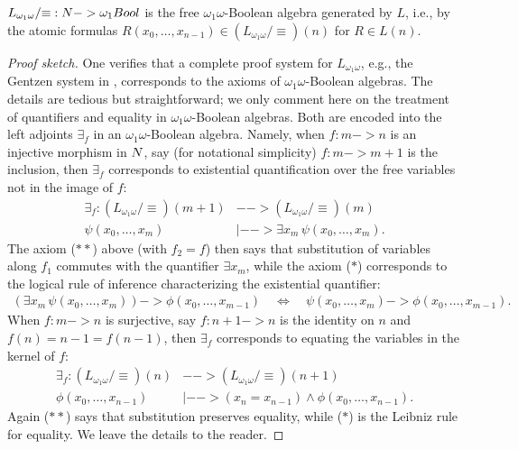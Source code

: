 \documentclass[11pt]{article}
\begin{document}
\begin{proposition}
$L_{\omega_1\omega}/{\equiv} : \*N -> \*{\omega_1 Bool}$ is the free $\omega_1\omega$-Boolean algebra generated by $L$, i.e., by the atomic formulas $R(x_0, \dotsc, x_{n-1}) \in (L_{\omega_1\omega}/{\equiv})(n)$ for $R \in L(n)$.
\end{proposition}
\begin{proof}[Proof sketch]
One verifies that a complete proof system for $L_{\omega_1\omega}$, e.g., the Gentzen system in \cite{LE}, corresponds to the axioms of $\omega_1\omega$-Boolean algebras.  The details are tedious but straightforward; we only comment here on the treatment of quantifiers and equality in $\omega_1\omega$-Boolean algebras.  Both are encoded into the left adjoints $\exists_f$ in an $\omega_1\omega$-Boolean algebra.  Namely, when $f : m -> n$ is an injective morphism in $\*N$, say (for notational simplicity) $f : m -> m+1$ is the inclusion, then $\exists_f$ corresponds to existential quantification over the free variables not in the image of $f$:
\begin{align*}
\exists_f : (L_{\omega_1\omega}/{\equiv})(m+1) &--> (L_{\omega_1\omega}/{\equiv})(m) \\
\psi(x_0, \dotsc, x_m) &|--> \exists x_m\, \psi(x_0, \dotsc, x_m).
\end{align*}
The axiom ($**$) above (with $f_2 = f$) then says that substitution of variables along $f_1$ commutes with the quantifier $\exists x_m$, while the axiom ($*$) corresponds to the logical rule of inference characterizing the existential quantifier:
\begin{align*}
(\exists x_m\, \psi(x_0, \dotsc, x_m)) -> \phi(x_0, \dotsc, x_{m-1}) \quad\iff\quad \psi(x_0, \dotsc, x_m) -> \phi(x_0, \dotsc, x_{m-1}).
\end{align*}
When $f : m -> n$ is surjective, say $f : n+1 -> n$ is the identity on $n$ and $f(n) = n-1 = f(n-1)$, then $\exists_f$ corresponds to equating the variables in the kernel of $f$:
\begin{align*}
\exists_f : (L_{\omega_1\omega}/{\equiv})(n) &--> (L_{\omega_1\omega}/{\equiv})(n+1) \\
\phi(x_0, \dotsc, x_{n-1}) &|--> (x_n = x_{n-1}) \wedge \phi(x_0, \dotsc, x_{n-1}).
\end{align*}
Again ($**$) says that substitution preserves equality, while ($*$) is the Leibniz rule for equality.  We leave the details to the reader.
% 

\end{proof}
\end{document}
